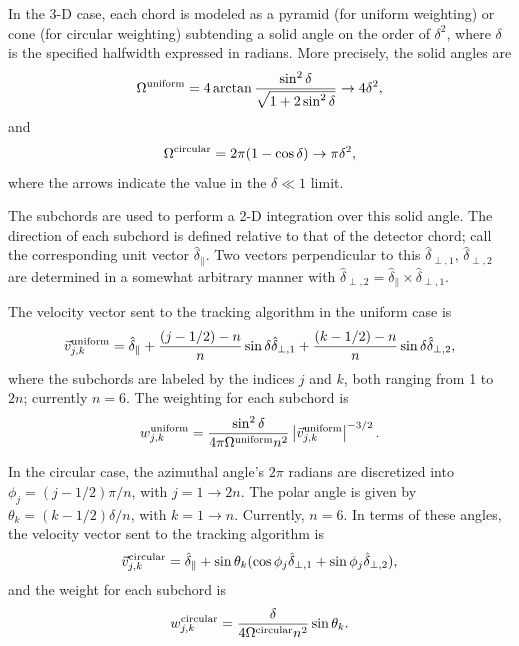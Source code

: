 \documentclass[12pt]{report}
\begin{document}
In the 3-D case, each chord is modeled as a pyramid (for uniform
weighting) or cone (for circular weighting) subtending a solid
angle on the order of $\delta^{2}$, where $\delta$ is the
specified halfwidth expressed in radians. More precisely, the
solid angles are
\begin{equation}
\Omega^{\rm uniform} = 4 \arctan \frac{\sin^{2} \delta}{\sqrt{1
+ 2 \sin^{2} \delta}} \rightarrow 4 \delta^{2},
\end{equation}
and
\begin{equation}
\Omega^{\rm circular} = 2 \pi (1 - \cos \delta) \rightarrow \pi 
\delta^{2},
\end{equation}
where the arrows indicate the value in the $\delta \ll 1$ limit.

The subchords are used to perform a 2-D integration over this solid
angle. The direction of each subchord is defined relative to that
of the detector chord; call the corresponding unit vector
$\hat{\delta}_{\parallel}$. Two vectors perpendicular to this
$\hat{\delta}_{\perp,1}$, $\hat{\delta}_{\perp,2}$
are determined in a somewhat arbitrary manner with
$\hat{\delta}_{\perp,2} = \hat{\delta}_{\parallel} \times
\hat{\delta}_{\perp,1}$.

The velocity vector sent to the tracking algorithm in the uniform
case is
\begin{equation}
\vec{v}_{j,k}^{\rm uniform} = \hat{\delta}_{\parallel}
+ \frac{(j - 1/2) - n}{n} \sin \delta \hat{\delta}_{\perp,1}
+ \frac{(k - 1/2) - n}{n} \sin \delta \hat{\delta}_{\perp,2},
\end{equation}
where the subchords are labeled by the indices $j$ and $k$,
both ranging from 1 to $2n$; currently $n = 6$.
The weighting for each subchord is
\begin{equation}
w_{j,k}^{\rm uniform} = \frac{\sin^{2} \delta}{4 \pi \Omega^{\rm uniform}
n^{2}}\left| \vec{v}_{j,k}^{\rm uniform} \right|^{-3/2}.
\end{equation}

In the circular case, the azimuthal angle's $2 \pi$ radians are
discretized into $\phi_{j} = (j - 1/2) \pi / n$, with 
$j = 1 \rightarrow 2n$.  The polar angle is given by
$\theta_{k} = (k - 1/2) \delta / n$, with $k = 1 \rightarrow n$.
Currently, $n = 6$. In terms of these angles, the velocity vector
sent to the tracking algorithm is
\begin{equation}
\vec{v}_{j,k}^{\rm circular} = \hat{\delta}_{\parallel}
+ \sin \theta_{k} ( \cos \phi_{j} \hat{\delta}_{\perp,1}
+ \sin \phi_{j} \hat{\delta}_{\perp,2}),
\end{equation}
and the weight for each subchord is
\begin{equation}
w_{j,k}^{\rm circular} = \frac{ \delta }{4 \Omega^{\rm circular} n^{2}}
\sin \theta_{k}.
\end{equation}
\end{document}
